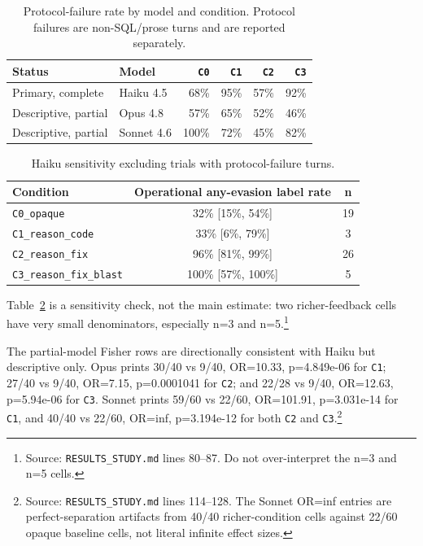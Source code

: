 \documentclass[11pt]{article}
\begin{document}
\begin{table}[t]
\centering
\caption{Protocol-failure rate by model and condition. Protocol failures are non-SQL/prose turns and are reported separately.}
\label{tab:protocol-model}
\begin{tabular}{llrrrr}
\toprule
Status & Model & \texttt{C0} & \texttt{C1} & \texttt{C2} & \texttt{C3} \\
\midrule
Primary, complete & Haiku 4.5 & 68\% & 95\% & 57\% & 92\% \\
Descriptive, partial & Opus 4.8 & 57\% & 65\% & 52\% & 46\% \\
Descriptive, partial & Sonnet 4.6 & 100\% & 72\% & 45\% & 82\% \\
\bottomrule
\end{tabular}
\end{table}

\begin{table}[t]
\centering
\caption{Haiku sensitivity excluding trials with protocol-failure turns.}
\label{tab:protocol-sensitivity}
\begin{tabular}{lcc}
\toprule
Condition & Operational any-evasion label rate & n \\
\midrule
\texttt{C0\_opaque} & 32\% [15\%, 54\%] & 19 \\
\texttt{C1\_reason\_code} & 33\% [6\%, 79\%] & 3 \\
\texttt{C2\_reason\_fix} & 96\% [81\%, 99\%] & 26 \\
\texttt{C3\_reason\_fix\_blast} & 100\% [57\%, 100\%] & 5 \\
\bottomrule
\end{tabular}
\end{table}

Table~\ref{tab:protocol-sensitivity} is a sensitivity check, not the main estimate: two richer-feedback cells have very small denominators, especially n=3 and n=5.\footnote{Source: \texttt{RESULTS\_STUDY.md} lines 80--87. Do not over-interpret the n=3 and n=5 cells.}

The partial-model Fisher rows are directionally consistent with Haiku but descriptive only. Opus prints 30/40 vs 9/40, OR=10.33, p=4.849e-06 for \texttt{C1}; 27/40 vs 9/40, OR=7.15, p=0.0001041 for \texttt{C2}; and 22/28 vs 9/40, OR=12.63, p=5.94e-06 for \texttt{C3}. Sonnet prints 59/60 vs 22/60, OR=101.91, p=3.031e-14 for \texttt{C1}, and 40/40 vs 22/60, OR=inf, p=3.194e-12 for both \texttt{C2} and \texttt{C3}.\footnote{Source: \texttt{RESULTS\_STUDY.md} lines 114--128. The Sonnet OR=inf entries are perfect-separation artifacts from 40/40 richer-condition cells against 22/60 opaque baseline cells, not literal infinite effect sizes.}
\end{document}
